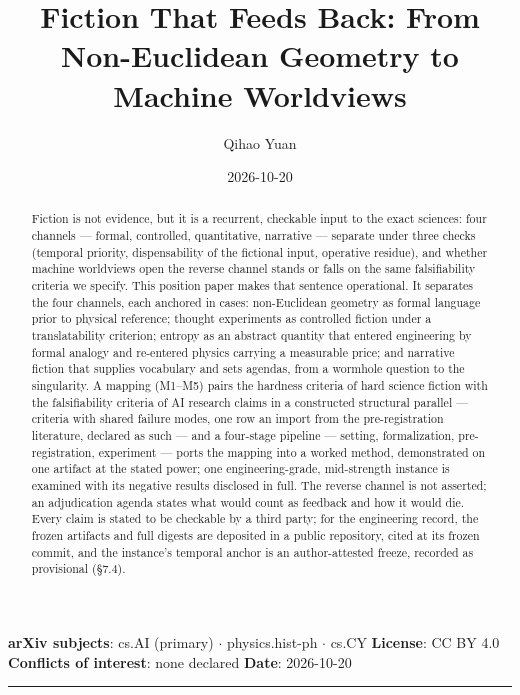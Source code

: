\documentclass[11pt,a4paper]{article}
\title{Fiction That Feeds Back: From Non-Euclidean Geometry to Machine Worldviews}
\author{Qihao Yuan}
\date{2026-10-20}
\begin{document}
\maketitle
\thispagestyle{empty}
\vspace{0.5em}
\noindent\textbf{arXiv subjects}: cs.AI (primary) $\cdot$ physics.hist-ph $\cdot$ cs.CY \quad \textbf{License}: CC BY 4.0 \quad \textbf{Conflicts of interest}: none declared \quad \textbf{Date}: 2026-10-20
\vspace{0.5em}
\hrule
\vspace{0.8em}

\begin{abstract}


Fiction is not evidence, but it is a recurrent, checkable input to the exact sciences: four channels — formal, controlled, quantitative, narrative — separate under three checks (temporal priority, dispensability of the fictional input, operative residue), and whether machine worldviews open the reverse channel stands or falls on the same falsifiability criteria we specify. This position paper makes that sentence operational. It separates the four channels, each anchored in cases: non-Euclidean geometry as formal language prior to physical reference; thought experiments as controlled fiction under a translatability criterion; entropy as an abstract quantity that entered engineering by formal analogy and re-entered physics carrying a measurable price; and narrative fiction that supplies vocabulary and sets agendas, from a wormhole question to the singularity. A mapping (M1–M5) pairs the hardness criteria of hard science fiction with the falsifiability criteria of AI research claims in a constructed structural parallel — criteria with shared failure modes, one row an import from the pre-registration literature, declared as such — and a four-stage pipeline — setting, formalization, pre-registration, experiment — ports the mapping into a worked method, demonstrated on one artifact at the stated power; one engineering-grade, mid-strength instance is examined with its negative results disclosed in full. The reverse channel is not asserted; an adjudication agenda states what would count as feedback and how it would die. Every claim is stated to be checkable by a third party; for the engineering record, the frozen artifacts and full digests are deposited in a public repository, cited at its frozen commit, and the instance's temporal anchor is an author-attested freeze, recorded as provisional (§7.4).

\end{abstract}
\end{document}
